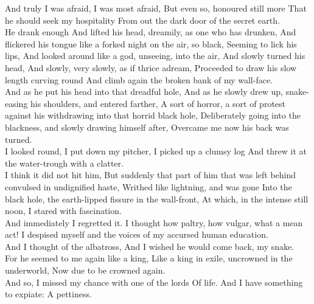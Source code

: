 \begin{poem}
 And truly I was afraid, I was most afraid,
 But even so, honoured still more
 That he should seek my hospitality
 From out the dark door of the secret earth.\\
 
 He drank enough
 And lifted his head, dreamily, as one who has drunken,
 And flickered his tongue like a forked night on the air, so black,
 Seeming to lick his lips,
 And looked around like a god, unseeing, into the air,
 And slowly turned his head,
 And slowly, very slowly, as if thrice adream,
 Proceeded to draw his slow length curving round
 And climb again the broken bank of my wall-face.\\
 
 And as he put his head into that dreadful hole,
 And as he slowly drew up, snake-easing his shoulders, and entered farther,
 A sort of horror, a sort of protest against his withdrawing into 
   that horrid black hole,
 Deliberately going into the blackness, and slowly drawing himself after,
 Overcame me now his back was turned.\\
 
 I looked round, I put down my pitcher,
 I picked up a clumsy log
 And threw it at the water-trough with a clatter.\\
 
 I think it did not hit him,
 But suddenly that part of him that was left behind convulsed in 
   undignified haste,
 Writhed like lightning, and was gone
 Into the black hole, the earth-lipped fissure in the wall-front,
 At which, in the intense still noon, I stared with fascination.\\
 
 And immediately I regretted it.
 I thought how paltry, how vulgar, what a mean act!
 I despised myself and the voices of my accursed human education.\\
 
 And I thought of the albatross,
 And I wished he would come back, my snake.\\
 
 For he seemed to me again like a king,
 Like a king in exile, uncrowned in the underworld,
 Now due to be crowned again.\\
 
 And so, I missed my chance with one of the lords
 Of life.
 And I have something to expiate:
 A pettiness.\\
 
\end{poem}

